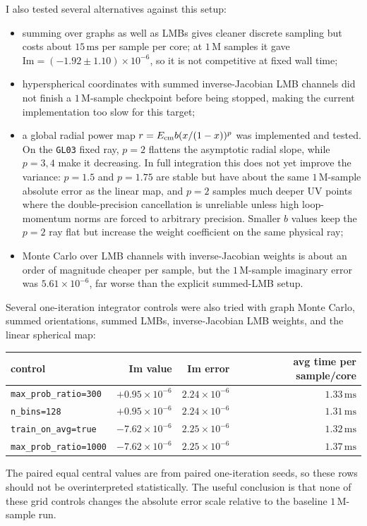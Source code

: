 \documentclass[11pt]{article}
\begin{document}
I also tested several alternatives against this setup:
\begin{itemize}
  \item summing over graphs as well as LMBs gives cleaner discrete sampling but
        costs about \(15\,\mathrm{ms}\) per sample per core; at
        \(1\,\mathrm{M}\) samples it gave
        \(\mathrm{Im}=(-1.92\pm1.10)\times10^{-6}\), so it is not competitive
        at fixed wall time;
  \item hyperspherical coordinates with summed inverse-Jacobian LMB channels
        did not finish a \(1\,\mathrm{M}\)-sample checkpoint before being
        stopped, making the current implementation too slow for this target;
  \item a global radial power map
        \(r=E_{\rm cm} b (x/(1-x))^p\) was implemented and tested.  On the
        \texttt{GL03} fixed ray, \(p=2\) flattens the asymptotic radial slope,
        while \(p=3,4\) make it decreasing.  In full integration this does not
        yet improve the variance: \(p=1.5\) and \(p=1.75\) are stable but have
        about the same \(1\,\mathrm{M}\)-sample absolute error as the linear
        map, and \(p=2\) samples much deeper UV points where the double-precision
        cancellation is unreliable unless high loop-momentum norms are forced
        to arbitrary precision.  Smaller \(b\) values keep the \(p=2\) ray
        flat but increase the weight coefficient on the same physical ray;
  \item Monte Carlo over LMB channels with inverse-Jacobian weights is about an
        order of magnitude cheaper per sample, but the \(1\,\mathrm{M}\)-sample
        imaginary error was \(5.61\times10^{-6}\), far worse than the explicit
        summed-LMB setup.
\end{itemize}

Several one-iteration integrator controls were also tried with graph Monte
Carlo, summed orientations, summed LMBs, inverse-Jacobian LMB weights, and the
linear spherical map:
\begin{center}
\scriptsize
\begin{tabular}{lrrr}
\toprule
control & Im value & Im error & avg time per sample/core\\
\midrule
\texttt{max\_prob\_ratio=300} &
\(+0.95\times10^{-6}\) & \(2.24\times10^{-6}\) & \(1.33\,\mathrm{ms}\)\\
\texttt{n\_bins=128} &
\(+0.95\times10^{-6}\) & \(2.24\times10^{-6}\) & \(1.31\,\mathrm{ms}\)\\
\texttt{train\_on\_avg=true} &
\(-7.62\times10^{-6}\) & \(2.25\times10^{-6}\) & \(1.32\,\mathrm{ms}\)\\
\texttt{max\_prob\_ratio=1000} &
\(-7.62\times10^{-6}\) & \(2.25\times10^{-6}\) & \(1.37\,\mathrm{ms}\)\\
\bottomrule
\end{tabular}
\end{center}
The paired equal central values are from paired one-iteration seeds, so these
rows should not be overinterpreted statistically.  The useful conclusion is
that none of these grid controls changes the absolute error scale relative to
the baseline \(1\,\mathrm{M}\)-sample run.
\end{document}
